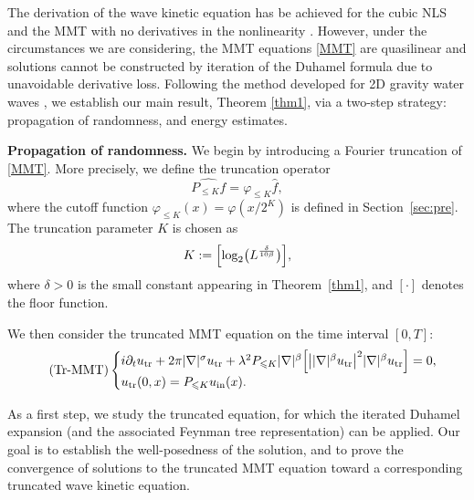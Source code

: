 \documentclass[UTF-8,reqno]{amsart}
\numberwithin{equation}{section}
\theoremstyle{definition}
\def\leq{\leqslant}
\def\leq{\leqslant}
\begin{document}
The derivation of the wave kinetic equation has be achieved for the cubic NLS \cite{DH23b,DH23c} and the MMT  with no derivatives in the nonlinearity  \cite{Vas24}.  
 However, under the circumstances we are considering,  the MMT equations \eqref{MMT} are quasilinear and solutions cannot
 be constructed by iteration of the Duhamel formula due to unavoidable derivative loss. Following the method  developed for 2D gravity water waves \cite{DIP25a,DIP25}, we establish our main result, Theorem \ref{thm1}, via a two-step strategy: propagation of randomness, and energy estimates.

 \textbf{Propagation of randomness.}
We begin by introducing a Fourier truncation of \eqref{MMT}. 
More precisely, we define the truncation operator
\[
\widehat{P_{\leq K}f}
=
\varphi_{\leq K}\widehat{f},
\]
where the cutoff function $\varphi_{\leq K}(x)=\varphi(x/2^K)$ is defined in Section~\ref{sec:pre}. 
The truncation parameter $K$ is chosen as
\begin{align}
    K:=\Bigl[\log_2\bigl(L^{\frac{\delta}{10\beta}}\bigr)\Bigr],
    \label{def:K}
\end{align}
where $\delta>0$ is the small constant appearing in Theorem~\ref{thm1}, 
and $[\cdot]$ denotes the floor function.

We then consider the truncated MMT equation on the time interval $[0,T]$:
\begin{align*}
\tag{Tr-MMT}\label{TrMMT}
\begin{cases}
i \partial_t u_{\rm tr}
+2\pi |\nabla|^\sigma u_{\rm tr}
+\lambda^{2}P_{\leq K}
|\nabla|^\beta
\Bigl[
\bigl||\nabla|^\beta u_{\rm tr}\bigr|^{2}
|\nabla|^\beta u_{\rm tr}
\Bigr]
=0,\\
u_{\rm tr}(0,x)=P_{\leq K}u_{\rm in}(x).
\end{cases}
\end{align*}

As a first step, we study the truncated equation, for which the iterated Duhamel expansion 
(and the associated Feynman tree representation) can be applied. 
Our goal is to establish the well-posedness of the solution, 
and to prove the convergence of solutions to the truncated MMT equation 
toward a corresponding truncated wave kinetic equation.
\end{document}
